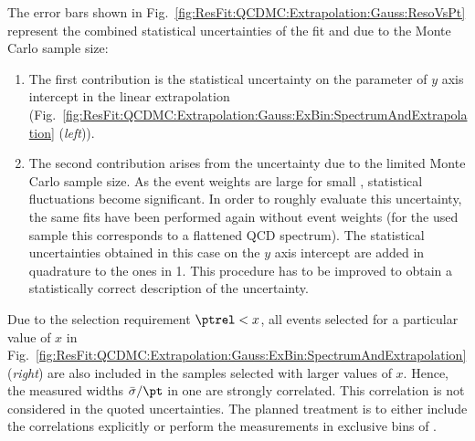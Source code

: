 The error bars shown in Fig.~\ref{fig:ResFit:QCDMC:Extrapolation:Gauss:ResoVsPt} represent the combined statistical uncertainties of the fit and due to the Monte Carlo sample size:
\begin{enumerate}
\item The first contribution is the statistical uncertainty on the parameter of $y$ axis intercept in the linear extrapolation (Fig.~\ref{fig:ResFit:QCDMC:Extrapolation:Gauss:ExBin:SpectrumAndExtrapolation} (\textit{left})).
\item The second contribution arises from the uncertainty due to the limited Monte Carlo sample size.
 As the event weights are large for small \pt, statistical fluctuations become significant.
 In order to roughly evaluate this uncertainty, the same fits have been performed again without event weights (for the used sample this corresponds to a flattened QCD spectrum).
 The statistical uncertainties obtained in this case on the $y$ axis intercept are added in quadrature to the ones in 1.
 This procedure has to be improved to obtain a statistically correct description of the uncertainty.
\end{enumerate}

Due to the selection requirement \mbox{$\ptrel < x$}, all events selected for a particular value of $x$ in Fig.~\ref{fig:ResFit:QCDMC:Extrapolation:Gauss:ExBin:SpectrumAndExtrapolation} (\textit{right}) are also included in the samples selected with larger values of $x$.
Hence, the measured widths $\bar{\sigma}/\pt$ in one \pt are strongly correlated.
This correlation is not considered in the quoted uncertainties.
The planned treatment is to either include the correlations explicitly or perform the measurements in exclusive bins of \ptrel.
